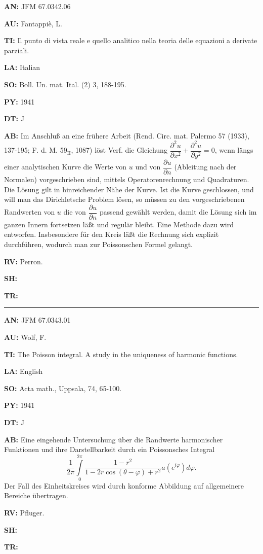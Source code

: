 \item{\bf AN:} JFM 67.0342.06
\item{\bf AU:} Fantappi\`e, L.
\item{\bf TI:} Il punto di vista reale e quello analitico nella teoria
delle equazioni a derivate parziali.
\item{\bf LA:} Italian
\item{\bf SO:} Boll. Un. mat. Ital. (2) 3, 188-195.
\item{\bf PY:} 1941
\item{\bf DT:} J
\item{\bf AB:}{\parindent15pt
 Im Anschlu{\ss}
an eine fr\"uhere Arbeit (Rend. Circ. mat. Palermo 57 (1933),
137-195; F. d. M. 59$_{\text{II}}$, 1087) l\"ost Verf. die Gleichung
$\dfrac{\partial ^2u}{\partial x^2}+\dfrac{\partial ^2u}{\partial y^2}=0$,
wenn l\"angs
einer analytischen Kurve die Werte von $u$ und von $\dfrac{\partial u}{\partial n}$
(Ableitung nach der
Normalen) vorgeschrieben sind, mittels Operatorenrechnung und Quadraturen.
Die L\"osung gilt in hinreichender N\"ahe der Kurve. Ist die Kurve geschlossen,
und
will man das Dirichletsche Problem l\"osen, so m\"ussen zu den vorgeschriebenen
Randwerten von $u$ die von
$\dfrac{\partial u}{\partial n}$ passend gew\"ahlt werden, damit die L\"osung sich im ganzen
Innern fortsetzen l\"a{\ss}t
und regul\"ar bleibt. Eine Methode dazu wird entworfen.
Insbesondere f\"ur den
Kreis l\"a{\ss}t die Rechnung sich explizit durchf\"uhren,
wodurch man
zur Poissonschen Formel gelangt.
}
\item{\bf RV:} Perron.
\item{\bf SH:}
\item{\bf TR:}

\bigskip\par\noindent\hrule\bigskip\par

\item{\bf AN:} JFM 67.0343.01
\item{\bf AU:} Wolf, F.
\item{\bf TI:} The Poisson integral. A study in the uniqueness of harmonic
functions.
\item{\bf LA:} English
\item{\bf SO:} Acta math., Uppsala, 74, 65-100.
\item{\bf PY:} 1941
\item{\bf DT:} J
\item{\bf AB:}{\parindent15pt
 Eine eingehende Untersuchung \"uber die Randwerte harmonischer Funktionen
und ihre Darstellbarkeit durch ein Poissonsches Integral
$$
\dfrac{1}{2\pi}\int\limits_0^{2\pi}\dfrac{1-r^2}{1-2r\cos (\theta-\varphi )+r^2}
a(e^{i\varphi})d\varphi.
$$
Der Fall des Einheitskreises wird durch konforme Abbildung auf allgemeinere
Bereiche \"ubertragen.
}
\item{\bf RV:} Pfluger.
\item{\bf SH:}
\item{\bf TR:}

